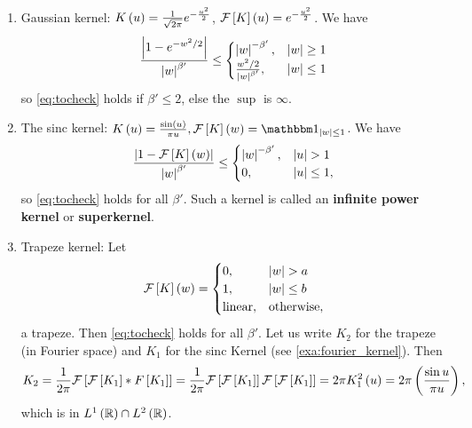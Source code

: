 \begin{example}\label{exa:fourier_kernel}
	\begin{enumerate}
		\item Gaussian kernel: $K\left(u\right) = \frac{1}{\sqrt{2\pi}} e^{-\frac{u^2}{2}}$,
		      $\mathcal{F}\left[K\right]\left(u\right) = e^{-\frac{u^2}{2}}$. We have
		      \begin{equation*}
			      \frac{\left| 1-e^{-w^2 /2 }\right|}{\left| w\right|^{\beta'}} \leq \begin{cases} \left| w\right|^{-\beta'},              & \left| w\right|\geq 1 \\
              \frac{w^2/2}{\left| w\right|^{\beta'}}, & \left| w\right|\leq 1\end{cases}
		      \end{equation*}
		      so \ref{eq:tocheck} holds if $\beta'\leq 2$, else the $\sup$ is $\infty$.
		\item The sinc kernel: $K\pa{u} = \frac{\sin\pa{u}}{\pi u}, \F\bra{K}\pa{w}=
			      \one_{\abs{w}\leq 1}$. We have
		      \begin{equation*}
			      \frac{\abs{1- \F\bra{K}\pa{w}}}{\abs{w}^{\beta'}} \leq \begin{cases}
				      \abs{w}^{-\beta'}, & \abs{u}> 1     \\
				      0,                 & \abs{u}\leq 1,
			      \end{cases}
		      \end{equation*}
		      so \ref{eq:tocheck} holds for all $\beta'$. Such a kernel is called an \textbf{infinite power kernel} or \textbf{superkernel}.
		\item Trapeze kernel: Let \begin{equation*}
			      \mathcal{F}\left[K\right]\left(w\right) = \begin{cases}
				      0,             & \left| w\right| >a        \\
				      1,             & \left| w\right|\leq b     \\
				      \text{linear}, & \text{otherwise},
			      \end{cases}
		      \end{equation*}
		      a trapeze. Then \ref{eq:tocheck} holds for all $\beta'$.
		      Let us write $K_2$ for the trapeze (in Fourier space) and $K_1$ for the sinc Kernel (see \ref{exa:fourier_kernel}). Then
		      \begin{equation*}
			      K_2 = \frac{1}{2\pi} \mathcal{F}\left[\mathcal{F}\left[K_1\right]\ast F\left[K_1\right]\right] = \frac{1}{2\pi} \mathcal{F}\left[\mathcal{F}\left[K_1\right]\right]\mathcal{F}\left[\mathcal{F}\left[K_1\right]\right] = 2\pi K_1^2\left(u\right) = 2\pi \left(\frac{\sin u}{\pi u}\right),
		      \end{equation*}
		      which is in $L^1\left(\mathbb{R}\right)\cap L^2\left(\mathbb{R}\right)$.
	\end{enumerate}
\end{example}
